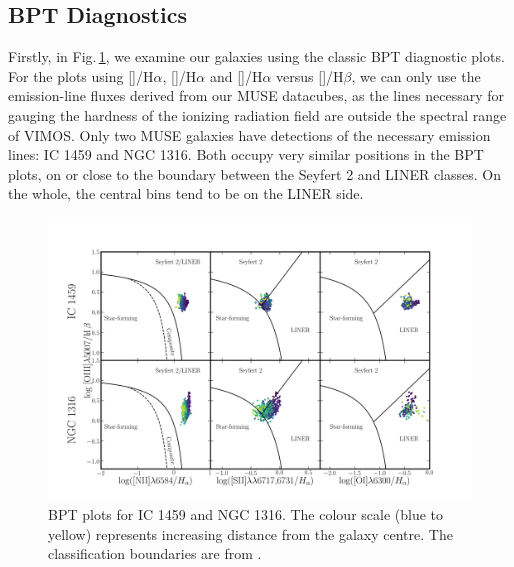 	\subsection{BPT Diagnostics}
		\label{subsec:BPT}
		Firstly, in Fig.\,\ref{fig:BPT}, we examine our galaxies using the classic BPT diagnostic plots. For the plots using []/H$\alpha$, []/H$\alpha$ and []/H$\alpha$ versus []/H$\beta$, we can only use the emission-line fluxes derived from our MUSE datacubes, as the lines necessary for gauging the hardness of the ionizing radiation field are outside the spectral range of VIMOS. Only two MUSE galaxies have detections of the necessary emission lines: IC 1459 and NGC 1316. Both occupy very similar positions in the BPT plots, on or close to the boundary between the Seyfert 2 and LINER classes. On the whole, the central bins tend to be on the LINER side.

		\begin{figure}
			\centering
			\includegraphics[width=\textwidth]{chapter5/BPT.png}
			\caption[BPT plots]{BPT plots for IC 1459 and NGC 1316. The colour scale (blue to yellow) represents increasing distance from the galaxy centre. The classification boundaries are from \citet{Kewley2006}.}
			\label{fig:BPT}
		\end{figure}

